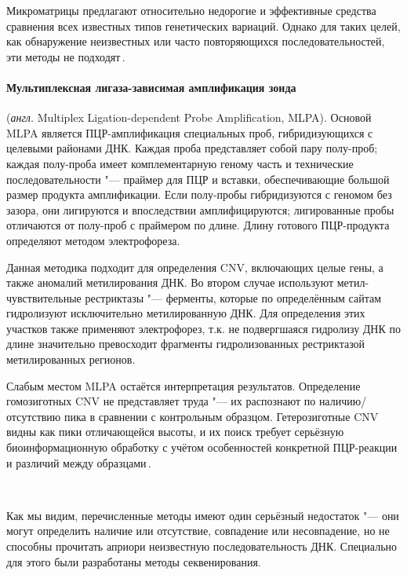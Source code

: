 \documentclass[a4paper,14pt]{extarticle}
\newcommand{\anglia}[1]{\textit{англ.} \textenglish{#1}}
\begin{document}
Микроматрицы предлагают относительно недорогие и эффективные средства сравнения всех известных типов генетических вариаций.
Однако для таких целей, как обнаружение неизвестных или часто повторяющихся последовательностей, эти методы не подходят\,\cite{Gresham_2008}.

\paragraph{Мультиплексная лигаза-зависимая амплификация зонда} (\anglia{Multiplex Ligation-dependent Probe Amplification, MLPA}).
Основой MLPA является ПЦР\hyp{}амплификация специальных проб, гибридизующихся с целевыми районами ДНК.
Каждая проба представляет собой пару полу-проб;
каждая полу-проба имеет комплементарную геному часть и технические последовательности "--- праймер для ПЦР и вставки, обеспечивающие большой размер продукта амплификации.
Если полу-пробы гибридизуются с геномом без зазора, они лигируются и впоследствии амплифицируются;
лигированные пробы отличаются от полу-проб с праймером по длине.
Длину готового ПЦР\hyp{}продукта определяют методом электрофореза.

Данная методика подходит для определения CNV, включающих целые гены, а также аномалий метилирования ДНК.
Во втором случае используют метил-чувствительные рестриктазы "--- ферменты, которые по определённым сайтам гидролизуют исключительно метилированную ДНК.
Для определения этих участков также применяют электрофорез, т.к. не подвергшаяся гидролизу ДНК по длине значительно превосходит фрагменты гидролизованных рестриктазой метилированных регионов.

Слабым местом MLPA остаётся интерпретация результатов.
Определение гомозиготных CNV не представляет труда "--- их распознают по наличию/отсутствию пика в сравнении с контрольным образцом.
Гетерозиготные CNV видны как пики отличающейся высоты, и их поиск требует серьёзную биоинформационную обработку с учётом особенностей конкретной ПЦР\hyp{}реакции и различий между образцами\,\cite{Stuppia_2012}.

~

Как мы видим, перечисленные методы имеют один серьёзный недостаток "--- они могут определить наличие или отсутствие, совпадение или несовпадение, но не способны прочитать априори неизвестную последовательность ДНК.
Специально для этого были разработаны методы секвенирования.
\end{document}
